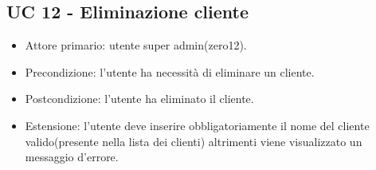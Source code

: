 \subsection*{UC 12 - Eliminazione cliente}
    \begin{itemize}
        \item Attore primario: utente super admin(zero12).
        \item Precondizione: l'utente ha necessità di eliminare un cliente.
        \item Postcondizione: l'utente ha eliminato il cliente.
        \item Estensione: l'utente deve inserire obbligatoriamente il nome del cliente valido(presente nella lista dei clienti) altrimenti viene visualizzato un messaggio d'errore.
    \end{itemize}

